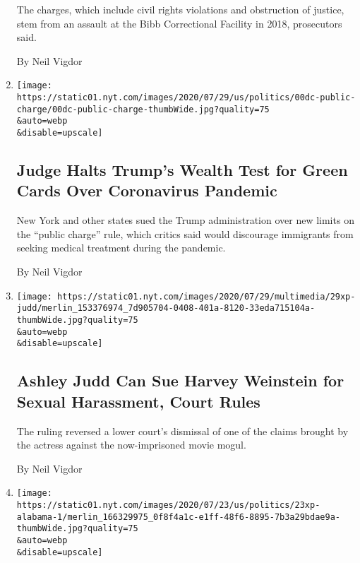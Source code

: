 \begin{enumerate}
  The charges, which include civil rights violations and obstruction of
  justice, stem from an assault at the Bibb Correctional Facility in
  2018, prosecutors said.

  By Neil Vigdor
\item
  \href{/2020/07/30/us/trump-green-card.html}{}

  \texttt{[image: https://static01.nyt.com/images/2020/07/29/us/politics/00dc-public-charge/00dc-public-charge-thumbWide.jpg?quality=75\\\&auto=webp\\\&disable=upscale]}

  \hypertarget{judge-halts-trumps-wealth-test-for-green-cards-over-coronavirus-pandemic}{%
  \subsection{Judge Halts Trump's Wealth Test for Green Cards Over
  Coronavirus
  Pandemic}\label{judge-halts-trumps-wealth-test-for-green-cards-over-coronavirus-pandemic}}

  New York and other states sued the Trump administration over new
  limits on the ``public charge'' rule, which critics said would
  discourage immigrants from seeking medical treatment during the
  pandemic.

  By Neil Vigdor
\item
  \href{/2020/07/29/business/media/judd-weinstein-lawsuit-appeal.html}{}

  \texttt{[image: https://static01.nyt.com/images/2020/07/29/multimedia/29xp-judd/merlin\_153376974\_7d905704-0408-401a-8120-33eda715104a-thumbWide.jpg?quality=75\\\&auto=webp\\\&disable=upscale]}

  \hypertarget{ashley-judd-can-sue-harvey-weinstein-for-sexual-harassment-court-rules}{%
  \subsection{Ashley Judd Can Sue Harvey Weinstein for Sexual
  Harassment, Court
  Rules}\label{ashley-judd-can-sue-harvey-weinstein-for-sexual-harassment-court-rules}}

  The ruling reversed a lower court's dismissal of one of the claims
  brought by the actress against the now-imprisoned movie mogul.

  By Neil Vigdor
\item
  \href{/2020/07/24/us/alabama-prisons-excessive-force.html}{}

  \texttt{[image: https://static01.nyt.com/images/2020/07/23/us/politics/23xp-alabama-1/merlin\_166329975\_0f8f4a1c-e1ff-48f6-8895-7b3a29bdae9a-thumbWide.jpg?quality=75\\\&auto=webp\\\&disable=upscale]}


\end{enumerate}
